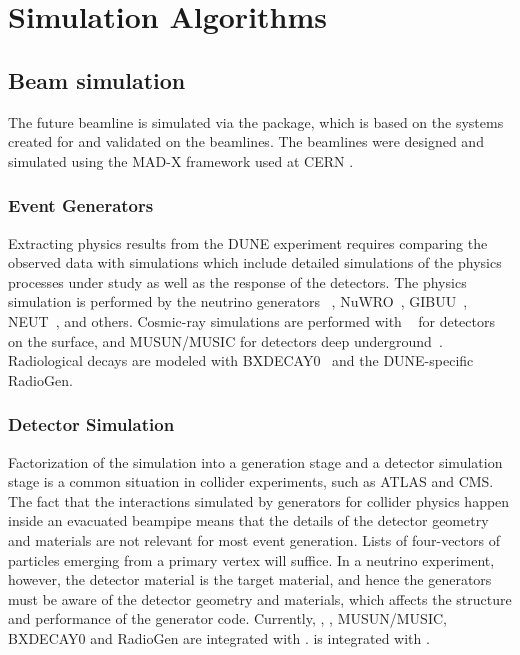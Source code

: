\documentclass[../main-v1.tex]{subfiles}
\begin{document}
\section{Simulation Algorithms }
\label{sec:algo:sim}

\subsection{Beam simulation}
\label{sec:beamsim}

The future  beamline is simulated via the  package, which is based on the systems created for and validated on the  beamlines.  The  beamlines were designed and simulated using the MAD-X framework used at CERN \cite{PhysRevAccelBeams.20.111001}.

\subsubsection{Event Generators}
\label{sec:eventgen}

Extracting physics results from the DUNE experiment requires comparing the observed data with simulations which include detailed simulations of the physics processes under study as well as the response of the detectors.  The physics simulation is performed by the neutrino generators ~\cite{Andreopoulos:2009rq}, NuWRO~\cite{NuWro2012}, GIBUU~\cite{Gallmeister:2016dnq}, NEUT~\cite{Hayato:2009zz}, and others.  Cosmic-ray simulations are performed with ~\cite{Wentz:2003bp,Dembinski:2020wrp} for detectors on the surface, and MUSUN/MUSIC for detectors deep underground~\cite{Kudryavtsev:2008qh,LBNEDOCDB9673}.  Radiological decays are modeled with BXDECAY0~\cite{Ponkratenko:2000um} and the DUNE-specific RadioGen.

\subsubsection{Detector Simulation}
\label{sec:detsim}

Factorization of the simulation into a generation stage and a detector simulation stage is a common situation in collider experiments, such as ATLAS and CMS.  The fact that the interactions simulated by generators for collider physics happen inside an evacuated beampipe means that the details of the detector geometry and materials are not relevant for most event generation.  Lists of four-vectors of particles emerging from a primary vertex will suffice.  In a neutrino experiment, however, the detector material is the target material, and hence the generators must be aware of the detector geometry and materials, which affects the structure and performance of the generator code.  Currently, , , MUSUN/MUSIC, BXDECAY0 and RadioGen are integrated with .   is integrated with .
\end{document}
